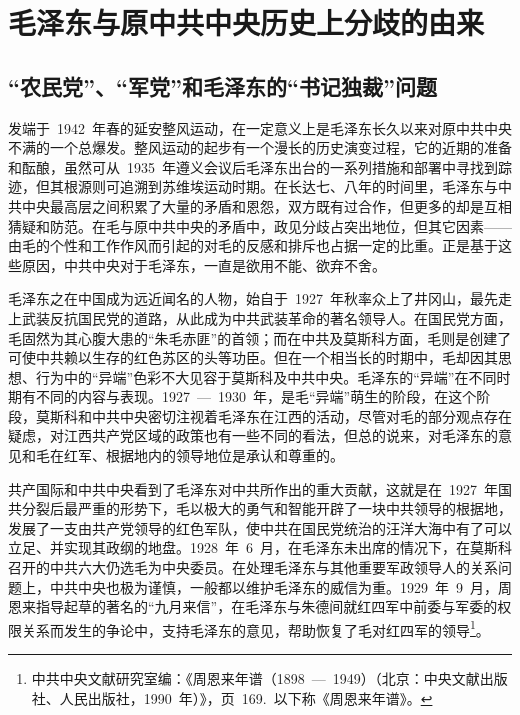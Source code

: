 
\chapter{毛泽东与原中共中央历史上分歧的由来}

\section{“农民党”、“军党”和毛泽东的“书记独裁”问题}

发端于~1942~年春的延安整风运动，在一定意义上是毛泽东长久以来对原中共中央不满的一个总爆发。整风运动的起步有一个漫长的历史演变过程，它的近期的准备和酝酿，虽然可从~1935~年遵义会议后毛泽东出台的一系列措施和部署中寻找到踪迹，但其根源则可追溯到苏维埃运动时期。在长达七、八年的时间里，毛泽东与中共中央最高层之间积累了大量的矛盾和恩怨，双方既有过合作，但更多的却是互相猜疑和防范。在毛与原中共中央的矛盾中，政见分歧占突出地位，但其它因素——由毛的个性和工作作风而引起的对毛的反感和排斥也占据一定的比重。正是基于这些原因，中共中央对于毛泽东，一直是欲用不能、欲弃不舍。

毛泽东之在中国成为远近闻名的人物，始自于~1927~年秋率众上了井冈山，最先走上武装反抗国民党的道路，从此成为中共武装革命的著名领导人。在国民党方面，毛固然为其心腹大患的“朱毛赤匪”的首领；而在中共及莫斯科方面，毛则是创建了可使中共赖以生存的红色苏区的头等功臣。但在一个相当长的时期中，毛却因其思想、行为中的“异端”色彩不大见容于莫斯科及中共中央。毛泽东的“异端”在不同时期有不同的内容与表现。1927~—~1930~年，是毛“异端”萌生的阶段，在这个阶段，莫斯科和中共中央密切注视着毛泽东在江西的活动，尽管对毛的部分观点存在疑虑，对江西共产党区域的政策也有一些不同的看法，但总的说来，对毛泽东的意见和毛在红军、根据地内的领导地位是承认和尊重的。

共产国际和中共中央看到了毛泽东对中共所作出的重大贡献，这就是在~1927~年国共分裂后最严重的形势下，毛以极大的勇气和智能开辟了一块中共领导的根据地，发展了一支由共产党领导的红色军队，使中共在国民党统治的汪洋大海中有了可以立足、并实现其政纲的地盘。1928~年~6~月，在毛泽东未出席的情况下，在莫斯科召开的中共六大仍选毛为中央委员。在处理毛泽东与其他重要军政领导人的关系问题上，中共中央也极为谨慎，一般都以维护毛泽东的威信为重。1929~年~9~月，周恩来指导起草的著名的“九月来信”，在毛泽东与朱德间就红四军中前委与军委的权限关系而发生的争论中，支持毛泽东的意见，帮助恢复了毛对红四军的领导\footnote{中共中央文献研究室编：《周恩来年谱（1898~—~1949）（北京：中央文献出版社、人民出版社，1990~年）》，页~169.~以下称《周恩来年谱》。}。

